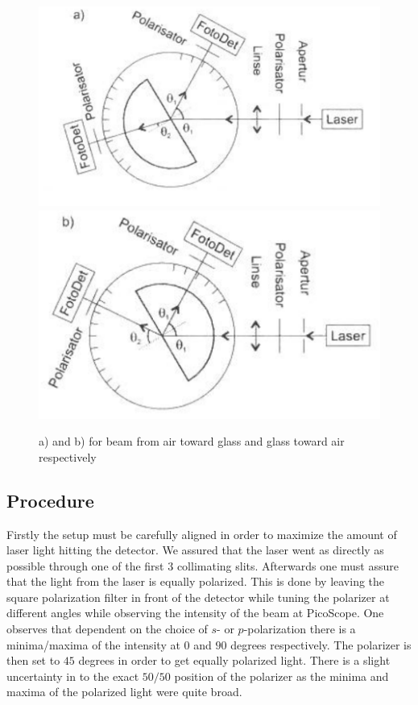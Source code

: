 \begin{figure}[h]
    \centering
    \includegraphics[width = \columnwidth]{setup1}
    \includegraphics[width = \columnwidth]{setup2}
    \caption{a) and b) for beam from air toward glass and glass toward air respectively}
    \label{fig:setup1}
\end{figure}

\subsection{Procedure}
Firstly the setup must be carefully aligned in order to maximize the amount of laser light hitting the detector.  We assured that the laser went as directly as possible through one of the first $3$ collimating slits. Afterwards one must assure that the light from the laser is equally polarized. This is done by leaving the square polarization filter in front of the detector while tuning the polarizer at different angles while observing the intensity of the beam at PicoScope. One observes that dependent on the choice of $s$- or $p$-polarization there is a minima/maxima of the intensity at $0$ and $90$ degrees respectively. The polarizer is then set to $45$ degrees in order to get equally polarized light. There is a slight uncertainty in to the exact $50/50$ position of the polarizer as the minima and maxima of the polarized light were quite broad.

